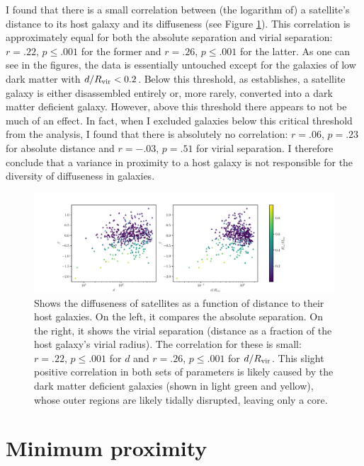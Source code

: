 I found that there is a small correlation between (the logarithm of) a satellite's distance to its host galaxy and its diffuseness (see Figure \ref{fig:beta-d}). This correlation is approximately equal for both the absolute separation and virial separation: $r = .22$, $p \leq .001$ for the former and $r = .26$, $p \leq .001$ for the latter. As one can see in the figures, the data is essentially untouched except for the galaxies of low dark matter with $d / R_{\rm{vir}} < 0.2$. Below this threshold, as \cite{morenoGalaxiesLackingDark2022} establishes, a satellite galaxy is either disassembled entirely or, more rarely, converted into a dark matter deficient galaxy. However, above this threshold there appears to not be much of an effect. In fact, when I excluded galaxies below this critical threshold from the analysis, I found that there is absolutely no correlation: $r = .06$, $p = .23$ for absolute distance and $r = -.03$, $p = .51$ for virial separation. I therefore conclude that a variance in proximity to a host galaxy is not responsible for the diversity of diffuseness in galaxies.

\begin{figure}
    \centering
    \includegraphics*[width=\textwidth*11/10]{figs/me/beta-d.pdf}
    \caption{
        Shows the diffuseness of satellites as a function of distance to their host galaxies. On the left, it compares the absolute separation. On the right, it shows the virial separation (distance as a fraction of the host galaxy's virial radius). The correlation for these is small: $r = .22$, $p \leq .001$ for $d$ and $r = .26$, $p \leq .001$ for $d / R_{\rm{vir}}$. This slight positive correlation in both sets of parameters is likely caused by the dark matter deficient galaxies (shown in light green and yellow), whose outer regions are likely tidally disrupted, leaving only a core.
    }
    \label{fig:beta-d}
\end{figure}


\section{Minimum proximity}

